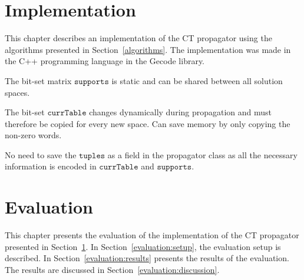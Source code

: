 \documentclass[a4paper,11pt]{article}
\newcommand{\T}[1]{\texttt{#1}}
\newcommand{\Secref}[1]{Section~\ref{#1}}
\newcommand{\Chapref}[1]{Section~\ref{#1}}
\newcommand{\CurrTable}{\texttt{currTable}}
\newcommand{\Supports}{\texttt{supports}}
\begin{document}
\section{Implementation}
\label{implementation}


This chapter describes an implementation of the CT propagator using the algorithms
presented in \Chapref{algorithms}. The implementation was made in the C++ programming
language in the Gecode library.

The bit-set matrix $\Supports$ is static and can be shared between all solution spaces.

The bit-set $\CurrTable$ changes dynamically during propagation and must therefore be copied for
every new space. Can save memory by only copying the non-zero words.

No need to save the $\T{tuples}$ as a field in the propagator class as all
the necessary information is encoded in $\CurrTable$ and $\Supports$.










\section{Evaluation}
\label{evaluation}
This chapter presents the evaluation of the implementation of the CT propagator
presented in \Chapref{implementation}. In \Secref{evaluation:setup},
the evaluation setup is described. In \Secref{evaluation:results} presents
the results of the evaluation. The results are discussed in \Secref{evaluation:discussion}.
\end{document}
